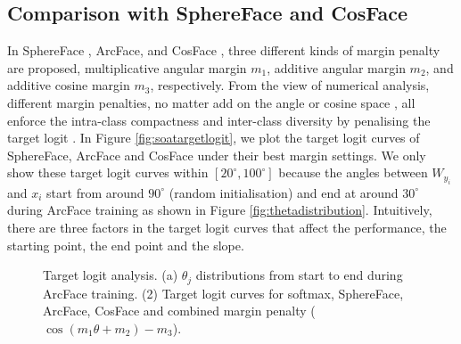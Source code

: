 \documentclass[10pt,twocolumn,letterpaper]{article}
\begin{document}
\subsection{Comparison with SphereFace and CosFace}

 In SphereFace \cite{liu2017sphereface,liu2016large}, ArcFace, and CosFace \cite{tencent2017CosineFace,wang2018additive}, three different kinds of margin penalty are proposed, \eg multiplicative angular margin $m_1$, additive angular margin $m_2$, and additive cosine margin $m_3$, respectively. From the view of numerical analysis, different margin penalties, no matter add on the angle \cite{liu2017sphereface} or cosine space \cite{tencent2017CosineFace}, all enforce the intra-class compactness and inter-class diversity by penalising the target logit \cite{pereyra2017regularizing}. In Figure \ref{fig:soatargetlogit}, we plot the target logit curves of SphereFace, ArcFace and CosFace under their best margin settings. We only show these target logit curves within $[20^{\circ}, 100^{\circ}]$ because the angles between $W_{y_i}$ and $x_i$ start from around $90^{\circ}$ (random initialisation) and end at around $30^{\circ}$ during ArcFace training as shown in Figure \ref{fig:thetadistribution}. Intuitively, there are three factors in the target logit curves that affect the performance, \ie the starting point, the end point and the slope. 

\begin{figure}[h!]
\centering
{}
\caption{Target logit analysis. (a) $\theta_j$ distributions from start to end during ArcFace training. (2) Target logit curves for softmax, SphereFace, ArcFace, CosFace and combined margin penalty ($\cos(m_1 \theta+m_2)-m_3$).}
\vspace{-4mm}
\label{fig:targetlogitscurves}
\end{figure}
\end{document}
